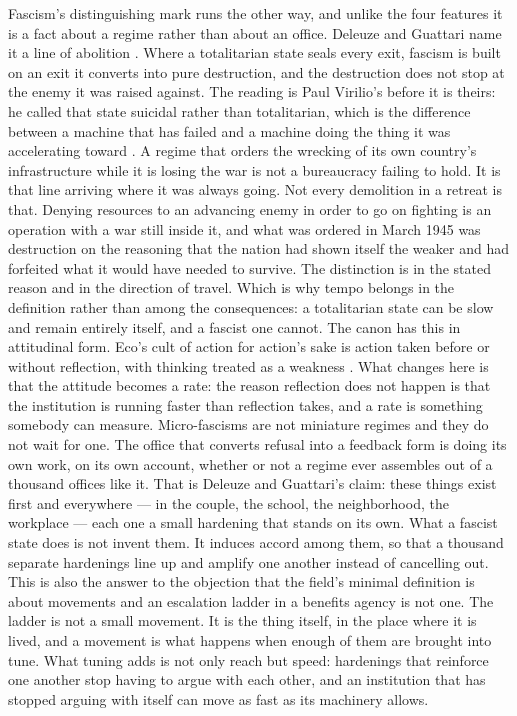 Fascism's distinguishing mark runs the other way, and unlike the four features it is a fact about a regime rather than about an office. Deleuze and Guattari name it a line of abolition \autocite{deleuze1987plateaus}. Where a totalitarian state seals every exit, fascism is built on an exit it converts into pure destruction, and the destruction does not stop at the enemy it was raised against. The reading is Paul Virilio's before it is theirs: he called that state suicidal rather than totalitarian, which is the difference between a machine that has failed and a machine doing the thing it was accelerating toward \autocite{virilio1976insecurite}. A regime that orders the wrecking of its own country's infrastructure while it is losing the war is not a bureaucracy failing to hold. It is that line arriving where it was always going. Not every demolition in a retreat is that. Denying resources to an advancing enemy in order to go on fighting is an operation with a war still inside it, and what was ordered in March 1945 was destruction on the reasoning that the nation had shown itself the weaker and had forfeited what it would have needed to survive. The distinction is in the stated reason and in the direction of travel. Which is why tempo belongs in the definition rather than among the consequences: a totalitarian state can be slow and remain entirely itself, and a fascist one cannot. The canon has this in attitudinal form. Eco's cult of action for action's sake is action taken before or without reflection, with thinking treated as a weakness \autocite{eco1995urfascism}. What changes here is that the attitude becomes a rate: the reason reflection does not happen is that the institution is running faster than reflection takes, and a rate is something somebody can measure.
Micro-fascisms are not miniature regimes and they do not wait for one. The office that converts refusal into a feedback form is doing its own work, on its own account, whether or not a regime ever assembles out of a thousand offices like it. That is Deleuze and Guattari's claim: these things exist first and everywhere — in the couple, the school, the neighborhood, the workplace — each one a small hardening that stands on its own. What a fascist state does is not invent them. It induces accord among them, so that a thousand separate hardenings line up and amplify one another instead of cancelling out. This is also the answer to the objection that the field's minimal definition is about movements and an escalation ladder in a benefits agency is not one. The ladder is not a small movement. It is the thing itself, in the place where it is lived, and a movement is what happens when enough of them are brought into tune. What tuning adds is not only reach but speed: hardenings that reinforce one another stop having to argue with each other, and an institution that has stopped arguing with itself can move as fast as its machinery allows.


